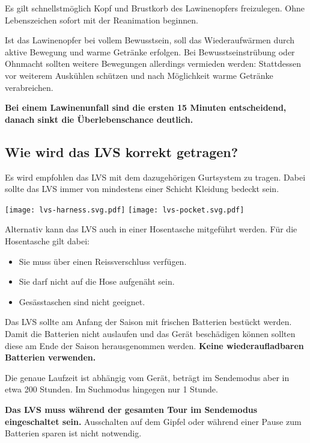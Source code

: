 Es gilt schnellstmöglich Kopf und Brustkorb des Lawinenopfers freizulegen.
Ohne Lebenszeichen sofort mit der Reanimation beginnen.

Ist das Lawinenopfer bei vollem Bewusstsein, soll das Wiederaufwärmen durch aktive Bewegung und warme Getränke erfolgen.
Bei Bewusstseinstrübung oder Ohnmacht sollten weitere Bewegungen allerdings vermieden werden: Stattdessen vor weiterem Auskühlen schützen und nach Möglichkeit warme Getränke verabreichen.

\textbf{Bei einem Lawinenunfall sind die ersten 15 Minuten entscheidend, danach sinkt die Überlebenschance deutlich.}

\newcolumn

\subsection{Wie wird das LVS korrekt getragen?}

Es wird empfohlen das LVS mit dem dazugehörigen Gurtsystem zu tragen.
Dabei sollte das LVS immer von mindestens einer Schicht Kleidung bedeckt sein.

\begin{center}
  \texttt{[image: lvs-harness.svg.pdf]}
  \texttt{[image: lvs-pocket.svg.pdf]}
\end{center}

Alternativ kann das LVS auch in einer Hosentasche mitgeführt werden.
Für die Hosentasche gilt dabei:

\begin{itemize}
  \item{Sie muss über einen Reissverschluss verfügen.}
  \item{Sie darf nicht auf die Hose aufgenäht sein.}
  \item{Gesässtaschen sind nicht geeignet.}
\end{itemize}

Das LVS sollte am Anfang der Saison mit frischen Batterien bestückt werden.
Damit die Batterien nicht auslaufen und das Gerät beschädigen können sollten diese am Ende der Saison herausgenommen werden.
\textbf{Keine wiederaufladbaren Batterien verwenden.}

Die genaue Laufzeit ist abhängig vom Gerät, beträgt im Sendemodus aber in etwa 200 Stunden.
Im Suchmodus hingegen nur 1 Stunde.

\textbf{Das LVS muss während der gesamten Tour im Sendemodus eingeschaltet sein.}
Ausschalten auf dem Gipfel oder während einer Pause zum Batterien sparen ist nicht notwendig.

\newcolumn

